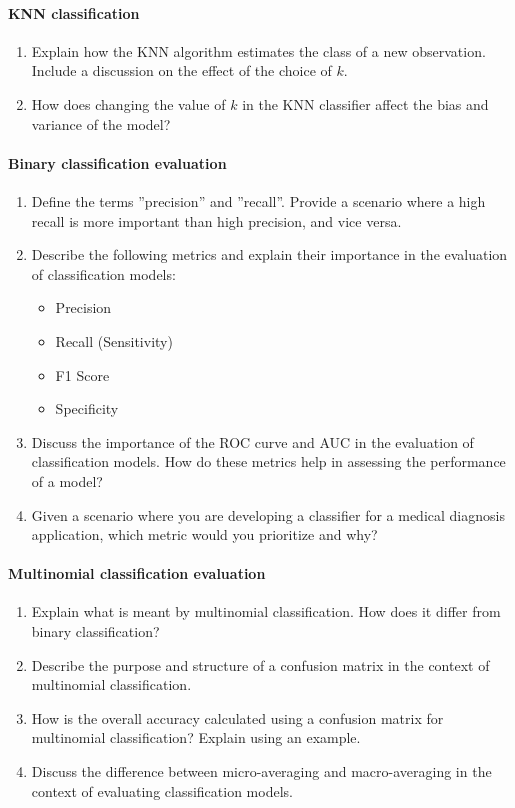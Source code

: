 \paragraph*{KNN classification}
\begin{enumerate}
    \item Explain how the KNN algorithm estimates the class of a new observation. Include a discussion on the effect of the choice of \( k \).
    \item How does changing the value of \( k \) in the KNN classifier affect the bias and variance of the model?
\end{enumerate}
\paragraph*{Binary classification evaluation}
\begin{enumerate}
    \item Define the terms ''precision'' and ''recall''. Provide a scenario where a high recall is more important than high precision, and vice versa.
    \item Describe the following metrics and explain their importance in the evaluation of classification models:
    \begin{itemize}
        \item Precision
        \item Recall (Sensitivity)
        \item F1 Score
        \item Specificity
    \end{itemize}
    \item Discuss the importance of the ROC curve and AUC in the evaluation of classification models. How do these metrics help in assessing the performance of a model?
    \item Given a scenario where you are developing a classifier for a medical diagnosis application, which metric would you prioritize and why?
\end{enumerate}
\paragraph*{Multinomial classification evaluation}
\begin{enumerate}
    \item Explain what is meant by multinomial classification. How does it differ from binary classification?
    \item Describe the purpose and structure of a confusion matrix in the context of multinomial classification.
    \item How is the overall accuracy calculated using a confusion matrix for multinomial classification? Explain using an example.
    \item Discuss the difference between micro-averaging and macro-averaging in the context of evaluating classification models.
\end{enumerate}
